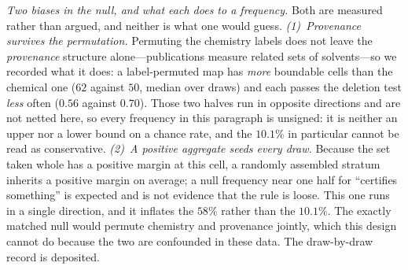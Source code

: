 \emph{Two biases in the null, and what each does to a frequency.} Both are measured rather than
argued, and neither is what one would guess.
\emph{(1)~Provenance survives the permutation.} Permuting the chemistry labels does not leave the
\emph{provenance} structure alone---publications measure related sets of solvents---so we recorded
what it does: a
label-permuted map has \emph{more} boundable cells than the chemical one ($62$ against $50$, median
over draws) and each passes the deletion test \emph{less} often ($0.56$ against $0.70$). Those two
halves run in opposite directions and are not netted here, so every frequency in this paragraph is
unsigned: it is neither an upper nor a lower bound on a chance rate, and the $10.1\%$ in particular
cannot be read as conservative.
\emph{(2)~A positive aggregate seeds every draw.} Because the set taken whole has a positive margin
at this cell, a randomly assembled stratum inherits a positive margin on average; a null frequency
near one half for ``certifies something'' is expected and is not evidence that the rule is loose.
This one runs in a single direction, and it inflates the $58\%$ rather than the $10.1\%$.
The exactly matched null would permute chemistry and provenance jointly, which this design cannot
do because the two are confounded in these data. The draw-by-draw record is deposited.

